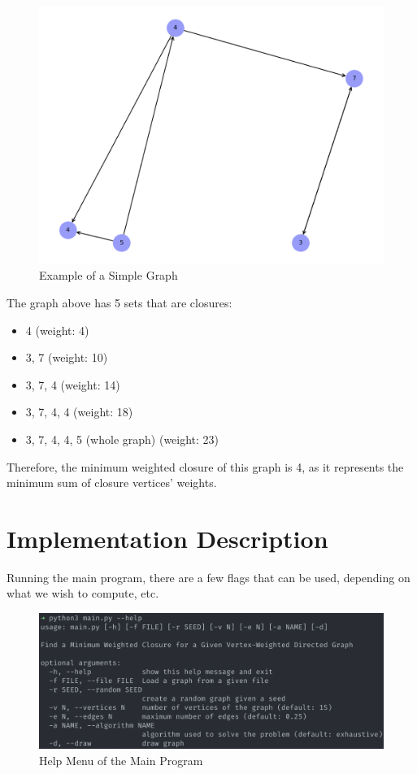 \documentclass[...]{revdetua}
\begin{document}
\begin{figure}[!htb]
    \centering
    \includegraphics[width=0.75\columnwidth]{./figures/simple_graph.png}
    \caption{Example of a Simple Graph}
    \label{fig: Simple Graph}
\end{figure}

\newpage

The graph above has 5 sets that are closures:

\begin{itemize}
    \item 4 (weight: 4)
    \item 3, 7 (weight: 10)
    \item 3, 7, 4 (weight: 14)
    \item 3, 7, 4, 4 (weight: 18)
    \item 3, 7, 4, 4, 5 (whole graph) (weight: 23)
\end{itemize}

Therefore, the minimum weighted closure of this graph is 4, as it represents the minimum sum of closure vertices' weights.

\section{ Implementation Description}

Running the main program, there are a few flags that can be used, depending on what we wish to compute, etc.

\begin{figure}[!htb]
    \centering
    \includegraphics[width=1\columnwidth]{./figures/program_help}
    \caption{Help Menu of the Main Program}
    \label{fig: Help Menu}
\end{figure}
\end{document}
